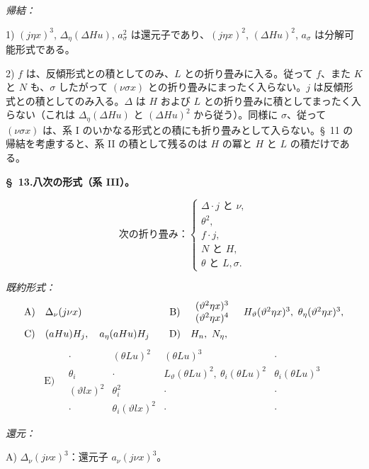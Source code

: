 \documentclass[11pt]{jlreq}
\newcommand{\A}{\Delta}
\begin{document}
\noindent\emph{帰結：}

1) $(j\eta x)^3$, $\A_\eta(\A Hu)$, $a_\sigma^2$ は還元子であり、$(j\eta x)^2$, $(\A Hu)^2$, $a_\sigma$ は分解可能形式である。

2) $f$ は、反傾形式との積としてのみ、$L$ との折り畳みに入る。従って $f$、また $K$ と $N$ も、$\sigma$ したがって $(\nu\sigma x)$ との折り畳みにまったく入らない。$j$ は反傾形式との積としてのみ入る。$\A$ は $H$ および $L$ との折り畳みに積としてまったく入らない（これは $\A_\eta(\A Hu)$ と $(\A Hu)^2$ から従う）。同様に $\sigma$、従って $(\nu\sigma x)$ は、系 I のいかなる形式との積にも折り畳みとして入らない。\S\ 11 の帰結を考慮すると、系 II の積として残るのは $H$ の冪と $H$ と $L$ の積だけである。

\begin{center}
\textbf{\S\ 13.\quad 八次の形式（系 III）。}
\end{center}
\[
\text{次の折り畳み：}\left\{\begin{array}{l}
\A\cdot j\text{ と }\nu,\\
\theta^2,\\
 f\cdot j,\\
 N\text{ と }H,\\
\theta\text{ と }L,\sigma.
\end{array}\right.
\]

\noindent\emph{既約形式：}
\[
\begin{array}{c@{\quad}l@{\qquad}c@{\quad}l}
\text{A)}&\A_\nu(j\nu x)&
\text{B)}&\begin{array}{c}(\vartheta^2\eta x)^3\\(\vartheta^2\eta x)^4\end{array}
\quad H_\vartheta(\vartheta^2\eta x)^3,
\ \theta_\eta(\vartheta^2\eta x)^3,\\[1em]
\text{C)}&(aHu)H_j,
\quad a_\eta(aHu)H_j&
\text{D)}&H_n,
\ N_\eta,
\end{array}
\]
\[
\text{E)}\quad
\begin{array}{c|c|c|c}
\cdot&(\theta Lu)^2&(\theta Lu)^3&\cdot\\
\theta_i&\cdot&L_\vartheta(\theta Lu)^2,
\ \theta_i(\theta Lu)^2&\theta_i(\theta Lu)^3\\
(\vartheta lx)^2&\theta_i^2&\cdot&\cdot\\
\cdot&\theta_i(\vartheta lx)^2&\cdot&\cdot
\end{array}
\]

\noindent\emph{還元：}

\noindent A) $\A_\nu(j\nu x)^3$：還元子 $a_\nu(j\nu x)^3$。
\end{document}
